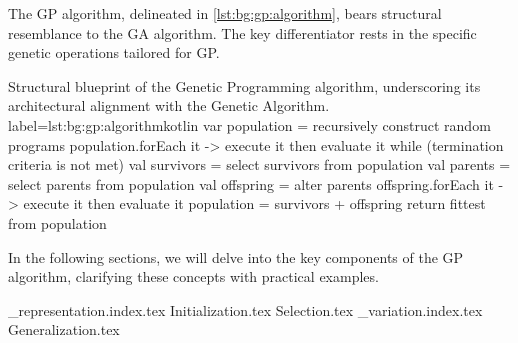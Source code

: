   The GP algorithm, delineated in \vref{lst:bg:gp:algorithm}, bears structural 
  resemblance to the GA algorithm. The key differentiator rests in the specific 
  genetic operations tailored for GP.

  \begin{code}{
    Structural blueprint of the Genetic Programming algorithm, underscoring its 
    architectural alignment with the Genetic Algorithm.
  }{label=lst:bg:gp:algorithm}{kotlin}
    var population = recursively construct random programs
    population.forEach { it -> execute it then evaluate it }
    while (termination criteria is not met) {
      val survivors = select survivors from population
      val parents = select parents from population
      val offspring = alter parents
      offspring.forEach { it -> execute it then evaluate it }
      population = survivors + offspring
    }
    return fittest from population
  \end{code}

  In the following sections, we will delve into the key components of the GP 
  algorithm, clarifying these concepts with practical examples.

{_representation.index.tex}
{Initialization.tex}
{Selection.tex}
{_variation.index.tex}
{Generalization.tex}
